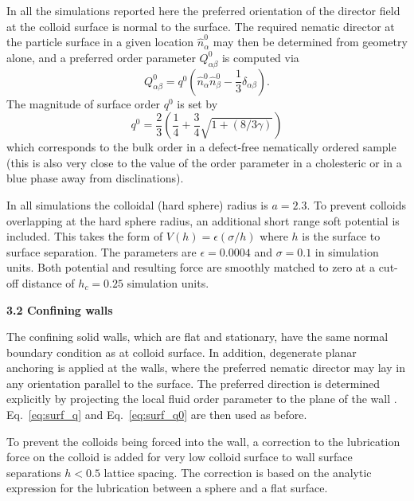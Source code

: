 \documentclass[12pt,twoside]{article}
\begin{document}
In all the simulations reported here the preferred orientation of the
director field at the colloid surface is normal to the surface. The
required nematic director at the particle surface in a given location
$\hat{n}^0_\alpha$ may then be determined from geometry alone,
and a preferred order parameter $Q_{\alpha\beta}^0$ is computed via
\begin{equation}
Q^0_{\alpha\beta} = q^0(\hat{n}_\alpha^0 \hat{n}_\beta^0 
- {\textstyle \frac{1}{3}} \delta_{\alpha\beta}).
\label{eq:surf_q}
\end{equation}
The magnitude of surface order $q^0$ is set by
\begin{equation}
q^0 = {\textstyle \frac{2}{3}} \left( {\textstyle \frac{1}{4}} 
+ {\textstyle \frac{3}{4}} \sqrt{1 + (8/3\gamma)} \right)
\label{eq:surf_q0}
\end{equation}
which corresponds to the bulk order in a defect-free nematically ordered 
sample~\cite{denniston} (this is also very close to the value of the order 
parameter in a cholesteric or in a blue phase away from disclinations).

In all simulations the colloidal (hard sphere) radius is $a = 2.3$. To
prevent colloids overlapping at the hard sphere radius, an additional
short range soft potential is included. This takes the form of
$V(h) = \epsilon (\sigma/h)$ where $h$ is the surface to surface separation.
The parameters are $\epsilon = 0.0004$ and $\sigma = 0.1$ in simulation
units. Both potential and resulting force are smoothly matched to zero at
a cut-off distance of $h_c = 0.25$ simulation units.

{\bf 3.2 Confining walls}

The confining solid walls, which are flat and stationary, have the
same normal boundary condition as at colloid surface. In addition,
degenerate planar anchoring is applied at the walls, where the
preferred nematic director may lay in any orientation parallel
to the surface. The preferred direction is determined explicitly
by projecting the local fluid order parameter to the plane of the
wall \cite{fournier2005}. Eq.~\ref{eq:surf_q} and Eq.~\ref{eq:surf_q0}
are then used as before.

To prevent the colloids being forced into the wall, a correction
to the lubrication force on the colloid is added for very low colloid
surface to wall surface separations $h < 0.5$ lattice spacing. The
correction is based on the analytic expression for the lubrication
between a sphere and a flat surface.
\end{document}
